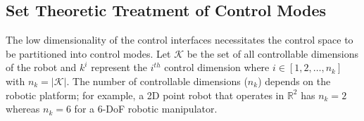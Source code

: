 \documentclass[letterpaper, 10 pt, conference]{ieeeconf}  %
\begin{document}
\subsection{Set Theoretic Treatment of Control Modes}\label{ssec:set_modes}
%
The low dimensionality of the control interfaces necessitates the control space to be partitioned into control modes.
Let $\mathcal{K}$ be the set of all controllable dimensions of the robot and $k^i$ represent the $i^{th}$ control dimension where $i \in [1,2,\dots,n_k]$ with $n_k = \vert\mathcal{K}\vert$. The number of controllable dimensions ($n_k$) depends on the robotic platform; for example, a 2D point robot that operates in $\mathbb{R}^2$ has $n_k = 2$ whereas $n_k =6$ for a 6-DoF robotic manipulator. 
\end{document}

